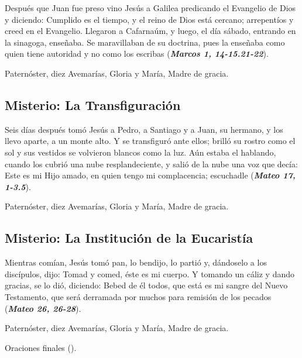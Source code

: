 \documentclass[./rosary.tex]{subfiles}
\newcounter{lux-counter}
\begin{document}
Después que Juan fue preso vino Jesús a Galilea predicando el Evangelio de Dios y diciendo: Cumplido es el tiempo, 
y el reino de Dios está cercano; arrepentíos y creed en el Evangelio. Llegaron a Cafarnaúm, y luego, el día sábado, 
entrando en la sinagoga, enseñaba. Se maravillaban de su doctrina, pues la enseñaba como quien tiene autoridad y 
no como los escribas (\textbf{\emph{Marcos 1, 14-15.21-22}}).

\begin{center}
      Paternóster, diez Avemarías, Gloria y María, Madre de gracia.
\end{center}

\subsection*{ Misterio: La Transfiguración}

Seis días después tomó Jesús a Pedro, a Santiago y a Juan, su hermano, y los llevo aparte, a un monte alto. 
Y se transfiguró ante ellos; brilló su rostro como el sol y sus vestidos se volvieron blancos como la luz. Aún estaba el hablando, 
cuando los cubrió una nube resplandeciente, y salió de la nube una voz que decía: Este es mi Hijo amado, 
en quien tengo mi complacencia; escuchadle (\textbf{\emph{Mateo 17, 1-3.5}}).

\begin{center}
      Paternóster, diez Avemarías, Gloria y María, Madre de gracia.
\end{center}

\subsection*{ Misterio: La Institución de la Eucaristía}

Mientras comían, Jesús tomó pan, lo bendijo, lo partió y, dándoselo a los discípulos, dijo: Tomad y comed, éste es mi cuerpo. 
Y tomando un cáliz y dando gracias, se lo dió, diciendo: Bebed de él todos, que está es mi sangre del Nuevo Testamento, 
que será derramada por muchos para remisión de los pecados (\textbf{\emph{Mateo 26, 26-28}}).

\begin{center}
      Paternóster, diez Avemarías, Gloria y María, Madre de gracia.
      
      Oraciones finales ().
\end{center}
\end{document}
